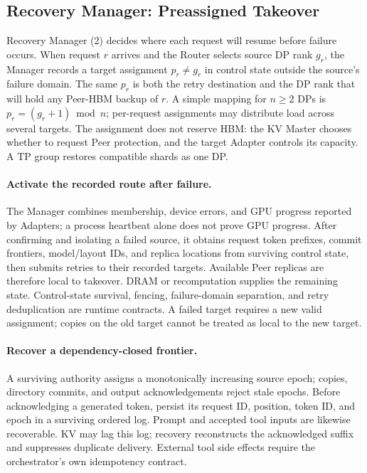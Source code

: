 \subsection{Recovery Manager: Preassigned Takeover}
\label{sec:parallel-recovery}
\label{sec:recovery-manager}

Recovery Manager (2) decides where each request will resume before
failure occurs. When request $r$ arrives and the Router selects source
DP rank $g_r$, the Manager records a target assignment $p_r\ne g_r$
in control state outside the source's failure domain. The same $p_r$
is both the retry destination and the DP rank that will hold any
Peer-HBM backup of $r$. A simple mapping for $n\ge2$ DPs is
$p_r=(g_r+1)\bmod n$; per-request assignments may distribute load across
several targets. The assignment does not reserve HBM: the KV Master
chooses whether to request Peer protection, and the target Adapter
controls its capacity. A TP group restores compatible shards as one DP.

\paragraph{Activate the recorded route after failure.}
The Manager combines membership, device errors, and GPU progress
reported by Adapters; a process heartbeat alone does not prove GPU
progress. After confirming and isolating a failed source, it obtains
request token prefixes, commit frontiers, model/layout IDs, and replica
locations from surviving control state, then submits retries to their
recorded targets. Available Peer replicas are therefore local to takeover.
DRAM or recomputation supplies the remaining state. Control-state
survival, fencing, failure-domain separation, and retry deduplication
are runtime contracts. A failed target requires a new valid assignment;
copies on the old target cannot be treated as local to the new target.

\paragraph{Recover a dependency-closed frontier.}
A surviving authority assigns a monotonically increasing source epoch;
copies, directory commits, and output acknowledgements reject stale epochs.
Before acknowledging a generated token, persist its request ID, position,
token ID, and epoch in a surviving ordered log. Prompt and accepted tool
inputs are likewise recoverable. KV may lag this log; recovery reconstructs
the acknowledged suffix and suppresses duplicate delivery. External tool
side effects require the orchestrator's own idempotency contract.

